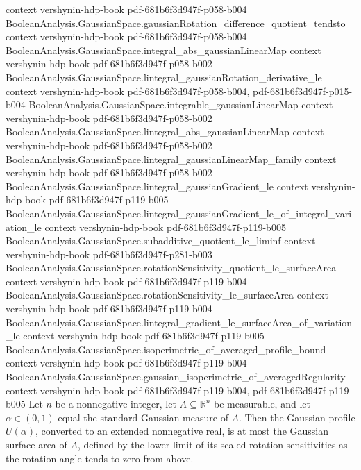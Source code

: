 \begin{theorem}
  {context}
  {vershynin-hdp-book}
  {pdf-681b6f3d947f-p058-b004}
\proofstep
  {BooleanAnalysis.GaussianSpace.gaussianRotation_difference_quotient_tendsto}
  {context}
  {vershynin-hdp-book}
  {pdf-681b6f3d947f-p058-b004}
\proofstep
  {BooleanAnalysis.GaussianSpace.integral_abs_gaussianLinearMap}
  {context}
  {vershynin-hdp-book}
  {pdf-681b6f3d947f-p058-b002}
\proofstep
  {BooleanAnalysis.GaussianSpace.lintegral_gaussianRotation_derivative_le}
  {context}
  {vershynin-hdp-book}
  {pdf-681b6f3d947f-p058-b004,
    pdf-681b6f3d947f-p015-b004}
\proofstep
  {BooleanAnalysis.GaussianSpace.integrable_gaussianLinearMap}
  {context}
  {vershynin-hdp-book}
  {pdf-681b6f3d947f-p058-b002}
\proofstep
  {BooleanAnalysis.GaussianSpace.lintegral_abs_gaussianLinearMap}
  {context}
  {vershynin-hdp-book}
  {pdf-681b6f3d947f-p058-b002}
\proofstep
  {BooleanAnalysis.GaussianSpace.lintegral_gaussianLinearMap_family}
  {context}
  {vershynin-hdp-book}
  {pdf-681b6f3d947f-p058-b002}
\proofstep
  {BooleanAnalysis.GaussianSpace.lintegral_gaussianGradient_le}
  {context}
  {vershynin-hdp-book}
  {pdf-681b6f3d947f-p119-b005}
\proofstep
  {BooleanAnalysis.GaussianSpace.lintegral_gaussianGradient_le_of_integral_variation_le}
  {context}
  {vershynin-hdp-book}
  {pdf-681b6f3d947f-p119-b005}
\proofstep
  {BooleanAnalysis.GaussianSpace.subadditive_quotient_le_liminf}
  {context}
  {vershynin-hdp-book}
  {pdf-681b6f3d947f-p281-b003}
\proofstep
  {BooleanAnalysis.GaussianSpace.rotationSensitivity_quotient_le_surfaceArea}
  {context}
  {vershynin-hdp-book}
  {pdf-681b6f3d947f-p119-b004}
\proofstep
  {BooleanAnalysis.GaussianSpace.rotationSensitivity_le_surfaceArea}
  {context}
  {vershynin-hdp-book}
  {pdf-681b6f3d947f-p119-b004}
\proofstep
  {BooleanAnalysis.GaussianSpace.lintegral_gradient_le_surfaceArea_of_variation_le}
  {context}
  {vershynin-hdp-book}
  {pdf-681b6f3d947f-p119-b005}
\proofstep
  {BooleanAnalysis.GaussianSpace.isoperimetric_of_averaged_profile_bound}
  {context}
  {vershynin-hdp-book}
  {pdf-681b6f3d947f-p119-b004}
\proofstep
  {BooleanAnalysis.GaussianSpace.gaussian_isoperimetric_of_averagedRegularity}
  {context}
  {vershynin-hdp-book}
  {pdf-681b6f3d947f-p119-b004,
    pdf-681b6f3d947f-p119-b005}
Let $n$ be a nonnegative integer, let $A\subseteq\mathbb R^n$ be measurable, and let
$\alpha\in(0,1)$ equal the standard Gaussian measure of $A$. Then the Gaussian profile
$U(\alpha)$, converted to an extended nonnegative real, is at most the Gaussian surface
area of $A$, defined by the lower limit of its scaled rotation sensitivities as the
rotation angle tends to zero from above.
\end{theorem}
